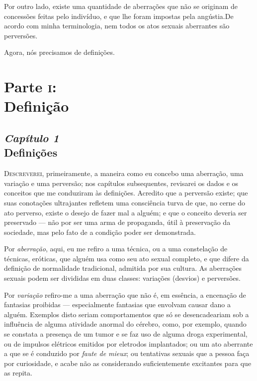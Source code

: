 Por outro lado, existe uma quantidade de aberrações que não se
originam de concessões feitas pelo indivíduo, e que lhe foram impostas
pela angústia.\idxangu[|)] De acordo com minha terminologia, nem todos os atos
sexuais aberrantes são perversões.

Agora, nós precisamos de definições.


\part[Parte \textsc{i}: Definição]{Parte \textsc{i}:\\ Definição}


\chapter[\textbf{1}\quad Definições]{{\large\textit{Capítulo 1}}\\ Definições}

\textsc{Descreverei,} primeiramente, a maneira como eu concebo uma aberração, uma
variação e uma perversão; nos capítulos subsequentes, revisarei os
dados e os conceitos que me conduziram às definições. Acredito que a
perversão existe; que suas conotações ultrajantes refletem uma
consciência turva de que, no cerne do ato perverso, existe o desejo de
fazer mal a alguém; e que o conceito deveria ser preservado --- não por
ser uma arma de propaganda, útil à preservação da sociedade, mas pelo
fato de a condição poder ser demonstrada.

Por \textit{aberração},\idxaberrdef{} aqui, eu me refiro a uma técnica, ou a uma
constelação de técnicas, eróticas, que alguém usa como seu ato sexual
completo, e que difere da definição de normalidade tradicional,
admitida por sua cultura. As aberrações sexuais podem ser divididas em
duas classes: variações (desvios) e perversões.

Por \textit{variação}\idxvariadefi{} refiro-me a uma aberração que não é, em
essência, a encenação de fantasias proibidas --- especialmente fantasias
que envolvam causar dano a alguém.\idxhost{} Exemplos disto seriam comportamentos
que só se desencadeariam sob a influência de alguma atividade anormal
do cérebro,\idxcerea{} como, por exemplo, quando se constata a presença de um
tumor e se faz uso de alguma droga experimental, ou de impulsos
elétricos emitidos por eletrodos implantados; ou um ato aberrante a que
se é conduzido por \textit{faute de mieux};\idxfaute{} ou tentativas sexuais que
a pessoa faça por curiosidade, e acabe não as considerando
suficientemente excitantes para que as repita.

